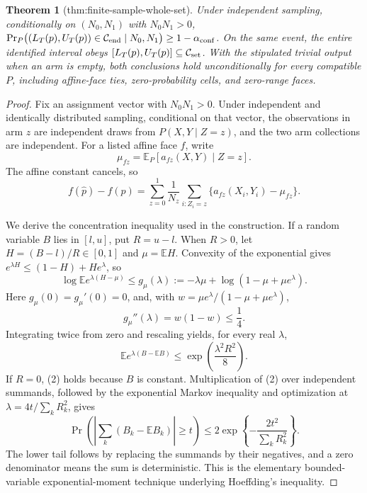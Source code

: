 \documentclass{article}
\newtheorem{theorem}{Theorem}
\begin{document}
\begin{theorem}[thm:finite-sample-whole-set]\label{thm:finite-sample-whole-set}
Under independent sampling, conditionally on \((N_0,N_1)\) with \(N_0N_1>0\), \(\Pr_P\bigl((L_T(p),U_T(p))\in\mathcal C_{\rm end}\mid N_0,N_1\bigr)\geq1-\alpha_{\rm conf}\). On the same event, the entire identified interval obeys \([L_T(p),U_T(p)]\subseteq\mathcal C_{\rm set}\). With the stipulated trivial output when an arm is empty, both conclusions hold unconditionally for every compatible \(P\), including affine-face ties, zero-probability cells, and zero-range faces.
\end{theorem}
\begin{proof}
Fix an assignment vector with \(N_0N_1>0\).  Under independent and
identically distributed sampling, conditional on that vector, the
observations in arm \(z\) are independent draws from
\(P(X,Y\mid Z=z)\), and the two arm collections are independent.  For a
listed affine face \(f\), write
\[
 \mu_{fz}=\mathbb E_P[a_{fz}(X,Y)\mid Z=z].
\]
The affine constant cancels, so
\[
 f(\widehat p)-f(p)
 =\sum_{z=0}^1\frac1{N_z}\sum_{i:Z_i=z}
 \{a_{fz}(X_i,Y_i)-\mu_{fz}\}. \tag{1}
\]

We derive the concentration inequality used in the construction.  If a
random variable \(B\) lies in \([l,u]\), put \(R=u-l\).  When \(R>0\), let
\(H=(B-l)/R\in[0,1]\) and \(\mu=\mathbb EH\).  Convexity of the exponential
gives \(e^{\lambda H}\le(1-H)+He^\lambda\), so
\[
 \log\mathbb E e^{\lambda(H-\mu)}
 \le g_\mu(\lambda)
 :=-\lambda\mu+\log(1-\mu+\mu e^\lambda).
\]
Here \(g_\mu(0)=g_\mu'(0)=0\), and, with
\(w=\mu e^\lambda/(1-\mu+\mu e^\lambda)\),
\[
 g_\mu''(\lambda)=w(1-w)\le\frac14.
\]
Integrating twice from zero and rescaling yields, for every real
\(\lambda\),
\[
 \mathbb E e^{\lambda(B-\mathbb EB)}
 \le\exp\!\left(\frac{\lambda^2R^2}{8}\right). \tag{2}
\]
If \(R=0\), (2) holds because \(B\) is constant.  Multiplication of (2)
over independent summands, followed by the exponential Markov inequality
and optimization at \(\lambda=4t/\sum_kR_k^2\), gives
\[
 \Pr\!\left(\left|\sum_k(B_k-\mathbb EB_k)\right|\ge t\right)
 \le2\exp\!\left\{-\frac{2t^2}{\sum_kR_k^2}\right\}. \tag{3}
\]
The lower tail follows by replacing the summands by their negatives, and a
zero denominator means the sum is deterministic.  This is the elementary
bounded-variable exponential-moment technique underlying Hoeffding's
inequality.


\end{proof}
\end{document}
